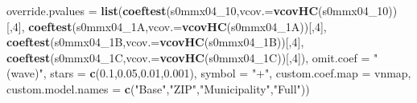 \documentclass[
]{article}
\newenvironment{Shaded}{\begin{snugshade}}{\end{snugshade}}
\newcommand{\DataTypeTok}[1]{\textcolor[rgb]{0.13,0.29,0.53}{#1}}
\newcommand{\DecValTok}[1]{\textcolor[rgb]{0.00,0.00,0.81}{#1}}
\newcommand{\FloatTok}[1]{\textcolor[rgb]{0.00,0.00,0.81}{#1}}
\newcommand{\KeywordTok}[1]{\textcolor[rgb]{0.13,0.29,0.53}{\textbf{#1}}}
\newcommand{\NormalTok}[1]{#1}
\newcommand{\StringTok}[1]{\textcolor[rgb]{0.31,0.60,0.02}{#1}}
\begin{document}
\begin{Shaded}
\begin{Highlighting}[]
          \DataTypeTok{override.pvalues =} \KeywordTok{list}\NormalTok{(}\KeywordTok{coeftest}\NormalTok{(s0mmx04_}\DecValTok{10}\NormalTok{,}\DataTypeTok{vcov.=}\KeywordTok{vcovHC}\NormalTok{(s0mmx04_}\DecValTok{10}\NormalTok{))[,}\DecValTok{4}\NormalTok{],}
                                  \KeywordTok{coeftest}\NormalTok{(s0mmx04_1A,}\DataTypeTok{vcov.=}\KeywordTok{vcovHC}\NormalTok{(s0mmx04_1A))[,}\DecValTok{4}\NormalTok{],}
                                  \KeywordTok{coeftest}\NormalTok{(s0mmx04_1B,}\DataTypeTok{vcov.=}\KeywordTok{vcovHC}\NormalTok{(s0mmx04_1B))[,}\DecValTok{4}\NormalTok{],}
                                  \KeywordTok{coeftest}\NormalTok{(s0mmx04_1C,}\DataTypeTok{vcov.=}\KeywordTok{vcovHC}\NormalTok{(s0mmx04_1C))[,}\DecValTok{4}\NormalTok{]),}
          \DataTypeTok{omit.coef =} \StringTok{"(wave)"}\NormalTok{, }\DataTypeTok{stars =} \KeywordTok{c}\NormalTok{(}\FloatTok{0.1}\NormalTok{,}\FloatTok{0.05}\NormalTok{,}\FloatTok{0.01}\NormalTok{,}\FloatTok{0.001}\NormalTok{), }\DataTypeTok{symbol =} \StringTok{"+"}\NormalTok{,}
          \DataTypeTok{custom.coef.map =}\NormalTok{ vnmap, }
          \DataTypeTok{custom.model.names =} \KeywordTok{c}\NormalTok{(}\StringTok{"Base"}\NormalTok{,}\StringTok{"ZIP"}\NormalTok{,}\StringTok{"Municipality"}\NormalTok{,}\StringTok{"Full"}\NormalTok{))}
\end{Highlighting}
\end{Shaded}
\end{document}
